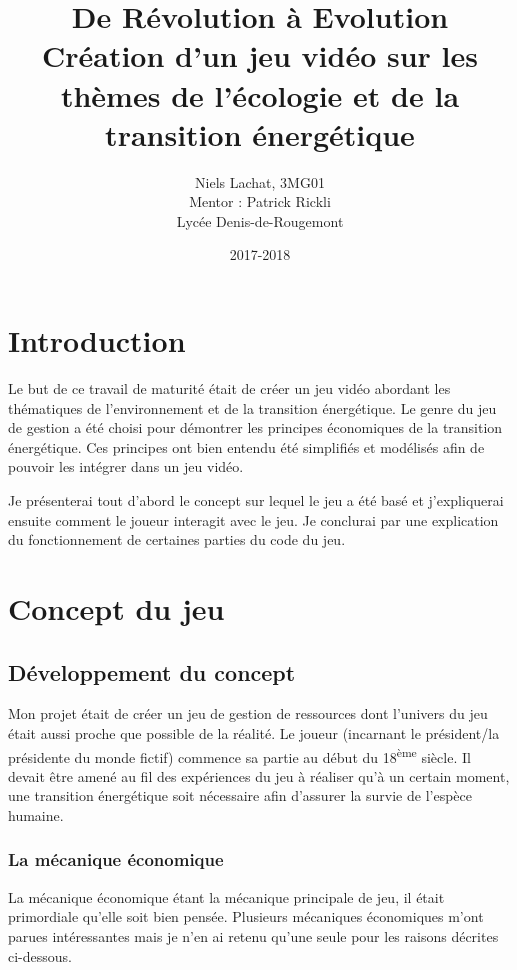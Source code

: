 \documentclass{article}
\title{De Révolution à Evolution \\ Création d'un jeu vidéo sur les thèmes de l'écologie et de la transition énergétique}
\date{2017-2018}
\author{Niels Lachat, 3MG01 \\ Mentor : Patrick Rickli \\ Lycée Denis-de-Rougemont}
\begin{document}
		

        \maketitle
        \newpage

        \tableofcontents
        \newpage

        \section{Introduction}
        Le but de ce travail de maturité était de créer un jeu vidéo abordant les thématiques de l'environnement et de la transition énergétique. 
        Le genre du jeu de gestion a été choisi pour démontrer les principes économiques de la transition énergétique.
        Ces principes ont bien entendu été simplifiés et modélisés afin de pouvoir les intégrer dans un jeu vidéo.
        
        
        Je présenterai tout d'abord le concept sur lequel le jeu a été basé et j'expliquerai ensuite comment le joueur interagit avec le jeu.
        Je conclurai par une explication du fonctionnement de certaines parties du code du jeu.

        \section{Concept du jeu}
        \subsection{Développement du concept}
        
        Mon projet était de créer un jeu de gestion de ressources dont l'univers du jeu était aussi proche que possible de la réalité. Le joueur (incarnant le président/la présidente du monde fictif) commence sa partie au début du 18\textsuperscript{ème} siècle. Il devait être amené au fil des expériences du jeu à réaliser qu'à un certain moment, une transition énergétique soit nécessaire afin d'assurer la survie de l'espèce humaine.
        
        \subsubsection{La mécanique économique}
        La mécanique économique étant la mécanique principale de jeu, il était primordiale qu'elle soit bien pensée.
        Plusieurs mécaniques économiques m'ont parues intéressantes mais je n'en ai retenu qu'une seule pour les raisons décrites ci-dessous.
        
\end{document}
